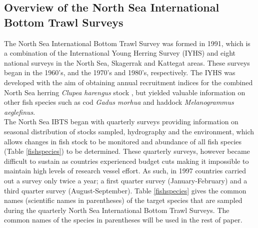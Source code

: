 \documentclass[a4paper 12pt]{article}
\numberwithin{equation}{section}
\begin{document}
\subsection{Overview of the North Sea International Bottom Trawl Surveys}
\label{overview}
\indent The North Sea International Bottom Trawl Survey was formed in 1991, which is a combination of the International Young Herring Survey (IYHS) and eight national surveys in the North Sea, Skagerrak and Kattegat areas. These surveys began in the 1960's, and the 1970's and 1980's, respectively. The IYHS was developed with the aim of obtaining annual recruitment indices for the combined North Sea herring \emph{Clupea harengus} stock \citep{ICES2012}, but yielded valuable information on other fish species such as cod \emph{Gadus morhua} and haddock \emph{Melanogrammus aeglefinus}.\\
\indent The North Sea IBTS began with quarterly surveys providing information on seasonal distribution of stocks sampled, hydrography and the environment, which allows changes in fish stock to be monitored and abundance of all fish species (Table \ref{fishspecies}) to be determined. These quarterly surveys, however became difficult to sustain as countries experienced budget cuts making it impossible to maintain high levels of research vessel effort. As such, in 1997 countries carried out a survey only twice a year; a first quarter survey (January-February) and a third quarter survey (August-September). Table \ref{fishspecies} gives the common names (scientific names in parentheses) of the target species that are sampled during the quarterly North Sea International Bottom Trawl Surveys. The common names of the species in parentheses will be used in the rest of paper.\\
\end{document}
